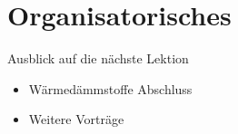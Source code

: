 







\section{Organisatorisches}
\BlueSectionSlide







\begin{frame}{Ausblick auf die nächste Lektion}
\begin{itemize}
    \item[\textbullet] Wärmedämmstoffe Abschluss 
    \item[\textbullet] Weitere Vorträge
\end{itemize}
\end{frame}



